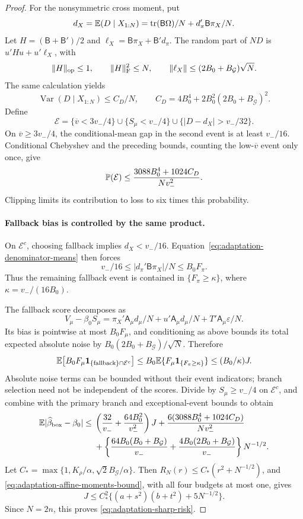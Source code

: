 \begin{proof}
For the nonsymmetric cross moment, put
\[
 d_X=\mathbb E(D\mid X_{1:N})
 =\operatorname{tr}(\mathsf B\Omega)/N
       +d_\pi'\mathsf B\pi_X/N.
\]
Let $H=(\mathsf B+\mathsf B')/2$ and
$\ell_X=\mathsf B\pi_X+\mathsf B'd_\pi$. The random part of $ND$ is
$u'Hu+u'\ell_X$, with
\[
 \|H\|_{\rm op}\le1,\qquad \|H\|_{\rm F}^2\le N,\qquad
 \|\ell_X\|\le(2B_0+B_{\mathcal G})\sqrt N.
\]
The same calculation yields
\begin{equation}
 \operatorname{Var}(D\mid X_{1:N})\le C_D/N,\qquad
 C_D=4B_0^4+2B_0^2(2B_0+B_{\mathcal G})^2.
 \label{eq:adaptation-cross-denominator}
\end{equation}
Define
\[
 \mathcal E=
 \{\overline v<3v_-/4\}\cup
 \{S_\mu<v_-/4\}\cup
 \{|D-d_X|>v_-/32\}.
\]
On $\overline v\ge3v_-/4$, the conditional-mean gap in the second
event is at least $v_-/16$. Conditional Chebyshev and the preceding
bounds, counting the low-$\overline v$ event only once, give
\begin{equation}
 \mathbb P(\mathcal E)\le
 \frac{3088B_0^4+1024C_D}{Nv_-^2}.
 \label{eq:adaptation-exceptional-cost}
\end{equation}
Clipping limits its contribution to loss to six times this probability.

\paragraph{Fallback bias is controlled by the same product.}
On $\mathcal E^c$, choosing fallback implies $d_X<v_-/16$.
Equation~\eqref{eq:adaptation-denominator-means} then forces
\[
 v_-/16\le|d_\pi'\mathsf B\pi_X|/N
 \le B_0F_\pi.
\]
Thus the remaining fallback event is contained in
$\{F_\pi\ge\kappa\}$, where $\kappa=v_-/(16B_0)$.

The fallback score decomposes as
\[
 V_\mu-\beta_0S_\mu
 =\pi_X'\mathsf A_\mu d_\mu/N
       +u'\mathsf A_\mu d_\mu/N
       +T'\mathsf A_\mu\varepsilon/N.
\]
Its bias is pointwise at most $B_0F_\mu$, and conditioning as above
bounds its total expected absolute noise by
$B_0(2B_0+B_{\mathcal G})/\sqrt N$. Therefore
\[
 \mathbb E\!\left[B_0F_\mu
       \mathbf 1_{\{\text{fallback}\}\cap\mathcal E^c}\right]
 \le B_0\mathbb E\{F_\mu\mathbf 1_{\{F_\pi\ge\kappa\}}\}
 \le(B_0/\kappa)J.
\]
Absolute noise terms can be bounded without their event indicators;
branch selection need not be independent of the scores. Divide by
$S_\mu\ge v_-/4$ on $\mathcal E^c$, and combine with the primary
branch and exceptional-event bounds to obtain
\begin{align}
 \mathbb E|\widehat\beta_{\rm box}-\beta_0|
 \le{}&
 \left(\frac{32}{v_-}+\frac{64B_0^2}{v_-^2}\right)J
 +\frac{6(3088B_0^4+1024C_D)}{Nv_-^2}\nonumber\\
 &+\left\{\frac{64B_0(B_0+B_{\mathcal G})}{v_-}
       +\frac{4B_0(2B_0+B_{\mathcal G})}{v_-}\right\}N^{-1/2}.
 \label{eq:adaptation-explicit-risk}
\end{align}
Let
$C_*=\max\{1,K_\rho/\alpha,\sqrt2B_{\mathcal G}/\alpha\}$.
Then $R_N(r)\le C_*(r^2+N^{-1/2})$, and
\eqref{eq:adaptation-affine-moments-bound}, with all four budgets at
most one, gives
\[
 J\le C_*^2\{(a+s^2)(b+t^2)+5N^{-1/2}\}.
\]
Since $N=2n$, this proves \eqref{eq:adaptation-sharp-risk}.


\end{proof}
